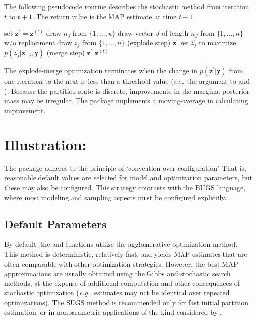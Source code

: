 \documentclass[article, nojss]{jss}
\newcommand{\bz}{\boldsymbol{z}}
\newcommand{\by}{\boldsymbol{y}}
\begin{document}
The following pseudocode routine describes the stochastic method from iteration $t$ to $t+1$. The return value is the MAP estimate at time $t+1$.
{
\singlespacing
\begin{algorithmic}[1]
    \STATE set $\bz^{\prime} = \bz^{(t)}$
    \STATE draw $n_J$ from $\{1,\ldots,n\}$
    \STATE draw vector $J$ of length $n_J$ from $\{1,\ldots,n\}$ w/o replacement
	\STATE draw $z_j^{\prime}$ from $\{1,\ldots,n\}$ (explode step)
    \ENDFOR
    \IF{$p(\bz^{\prime}|\by) > p(\bz^{(t)}|\by)$}
	\RETURN $\bz^{\prime}$
    \ENDIF
	\STATE set $z_j^{\prime}$ to maximize $p(z_j^{\prime}|\bz_{-j}^{\prime},\by)$ (merge step)
    \ENDFOR
    \IF{$p(\bz^{\prime}|\by) > p(\bz^{(t)}|\by)$}
	\RETURN $\bz^{\prime}$
    \ELSE
	\RETURN $\bz^{(t)}$
    \ENDIF
\end{algorithmic}
}  
The explode-merge optimization terminates when the change in $p(\bz^{\prime}|\by)$ from one iteration to the next is less than a threshold value ({\it i.e.}, the  argument to  and ). Because the partition state is discrete, improvements in the marginal posterior mass may be irregular. The  package implements a moving-average in calculating improvement.


\section[Illustration]{Illustration: } \label{Examples:profLinear}

The  package adheres to the principle of `convention over configuration'. That is, reasonable default values are selected for model and optimization parameters, but these may also be configured. This strategy contrasts with the BUGS \citep{LunnSpiegelhalterThomasBest2009} language, where most modeling and sampling aspects must be configured explicitly.   

\subsection[Defaults]{Default Parameters}

By default, the  and  functions utilize the agglomerative optimization method. This method is deterministic, relatively fast, and yields MAP estimates that are often comparable with other optimization strategies. However, the best MAP approximations are usually obtained using the Gibbs and stochastic search methods, at the expense of additional computation and other consequences of stochastic optimization ({\it e.g.}, estimates may not be identical over repeated optimizations). The SUGS method is recommended only for fast initial partition estimation, or in nonparametric applications of the kind considered by \citet{WangDunson2010}.    
\end{document}
